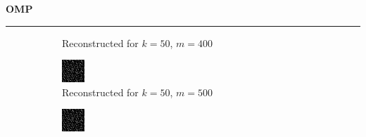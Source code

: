 \documentclass[a4paper,12pt]{article}
\newenvironment{solution}[2][]{%
    \begin{mdframed}[linecolor=blue!70!black, linewidth=2pt, roundcorner=10pt, backgroundcolor=yellow!10!white, skipabove=12pt, skipbelow=12pt]%
        \textbf{\large #2}
        \par\noindent\rule{\textwidth}{0.4pt}
}{
    \end{mdframed}
}
\begin{document}
\begin{solution}{OMP}
\begin{figure}[H]
\begin{subfigure}[t]{0.23\textwidth}
        \caption{Reconstructed for $k = 50$, $m = 400$}
    \end{subfigure}
    \begin{subfigure}[t]{0.23\textwidth}
        \centering
        \includegraphics[width=\textwidth]{../images/omp/Reconstructed_k_50_m_500.png}
        \caption{Reconstructed for $k = 50$, $m = 500$}
    \end{subfigure}
    \begin{subfigure}[t]{0.23\textwidth}
        \centering
        \includegraphics[width=\textwidth]{../images/omp/Reconstructed_k_50_m_600.png}

\end{subfigure}
\end{figure}
\end{solution}
\end{document}
